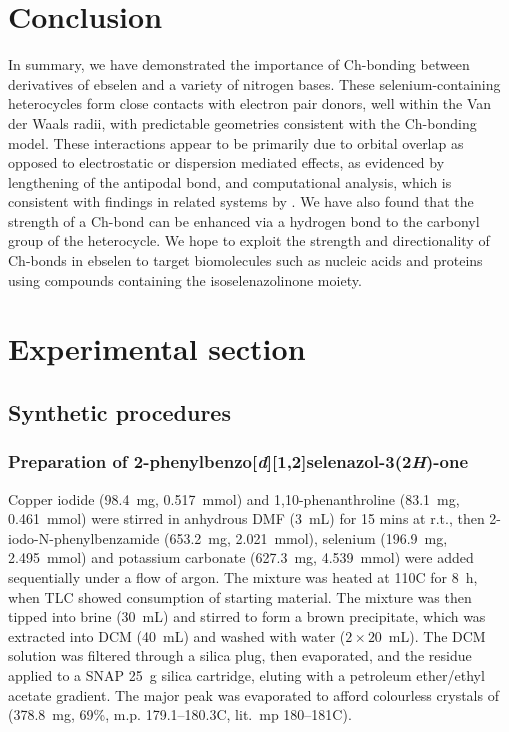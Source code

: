 \begin{refsection}
    \section{Conclusion}
    In summary, we have demonstrated the importance of Ch-bonding between derivatives of ebselen  and a variety of nitrogen bases.
    These selenium-containing heterocycles form close contacts with electron pair donors, well within the Van der Waals radii, with predictable geometries consistent with the Ch-bonding model.
    These interactions appear to be primarily due to orbital overlap as opposed to electrostatic or dispersion mediated effects, as evidenced by lengthening of the antipodal  bond, and computational analysis, which is consistent with findings in related systems by \citeauthor{Pascoe2017}.\autocite{Pascoe2017}
    We have also found that the strength of a Ch-bond can be enhanced via a hydrogen bond to the carbonyl group of the heterocycle.
    We hope to exploit the strength and directionality of Ch-bonds in ebselen to target biomolecules such as nucleic acids and proteins using compounds containing the isoselenazolinone moiety.
    
    \section{Experimental section}
    
    \subsection{Synthetic procedures}
    
    \subsubsection[Preparation of \refcmpd{ebs}]{Preparation of 2-phenylbenzo[\textit{d}][1,2]selenazol-3(2\textit{H})-one }
    
    Copper iodide (98.4~mg, 0.517~mmol) and 1,10-phenanthroline (83.1~mg, 0.461~mmol) were stirred in anhydrous DMF (3~mL) for 15 mins at r.t., then 2-iodo-N-phenylbenz\-amide (653.2~mg, 2.021~mmol), selenium (196.9~mg, 2.495~mmol) and potassium carbonate (627.3~mg, 4.539~mmol) were added sequentially under a flow of argon.
    The mixture was heated at 110\degree{}C for 8~h, when TLC showed consumption of starting material.
    The mixture was then tipped into brine (30~mL) and stirred to form a brown precipitate, which was extracted into DCM (40~mL) and washed with water ($ 2 \times 20 $~mL).
    The DCM solution was filtered through a silica plug, then evaporated, and the residue applied to a SNAP 25~g silica cartridge, eluting with a petroleum ether/ethyl acetate gradient.
    The major peak was evaporated to afford colourless crystals of  (378.8~mg, 69\%, m.p. 179.1--180.3\degree{}C, lit.\ mp 180--181\degree{}C). 
    

\end{refsection}
